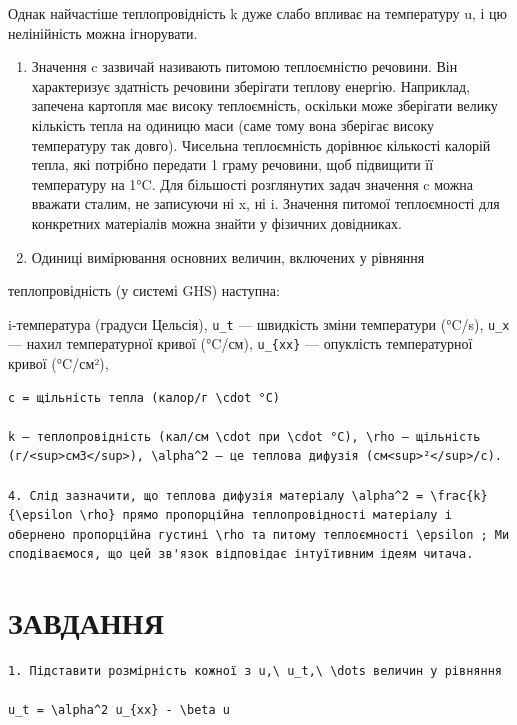 \documentclass[
  ukrainian,
]{article}
\begin{document}
Однак найчастіше теплопровідність k дуже слабо впливає на температуру u,
і цю нелінійність можна ігнорувати.

\begin{enumerate}
\def\labelenumi{\arabic{enumi}.}
\setcounter{enumi}{1}
\item
  Значення c зазвичай називають питомою теплоємністю речовини. Він
  характеризує здатність речовини зберігати теплову енергію. Наприклад,
  запечена картопля має високу теплоємність, оскільки може зберігати
  велику кількість тепла на одиницю маси (саме тому вона зберігає високу
  температуру так довго). Чисельна теплоємність дорівнює кількості
  калорій тепла, які потрібно передати 1 граму речовини, щоб підвищити
  її температуру на 1°C. Для більшості розглянутих задач значення c
  можна вважати сталим, не записуючи ні x, ні i. Значення питомої
  теплоємності для конкретних матеріалів можна знайти у фізичних
  довідниках.
\item
  Одиниці вимірювання основних величин, включених у рівняння
\end{enumerate}

теплопровідність (у системі GHS) наступна:

i-температура (градуси Цельсія), \texttt{u\_t} --- швидкість зміни
температури (°C/s), \texttt{u\_x} --- нахил температурної кривої
(°C/см), \texttt{u\_\{xx\}} --- опуклість температурної кривої (°C/см²),

\begin{verbatim}
c = щільність тепла (калор/г \cdot °C)

k — теплопровідність (кал/см \cdot при \cdot °C), \rho — щільність (г/<sup>см3</sup>), \alpha^2 — це теплова дифузія (см<sup>²</sup>/с).

4. Слід зазначити, що теплова дифузія матеріалу \alpha^2 = \frac{k}{\epsilon \rho} прямо пропорційна теплопровідності матеріалу і обернено пропорційна густині \rho та питому теплоємності \epsilon ; Ми сподіваємося, що цей зв'язок відповідає інтуїтивним ідеям читача.
\end{verbatim}

\section{ЗАВДАННЯ}\label{ux437ux430ux432ux434ux430ux43dux43dux44f-2}

\begin{verbatim}
1. Підставити розмірність кожної з u,\ u_t,\ \dots величин у рівняння

u_t = \alpha^2 u_{xx} - \beta u
\end{verbatim}
\end{document}
